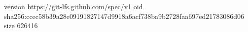 version https://git-lfs.github.com/spec/v1
oid sha256:ccec58b39a28e09191827147d9918a6acf738ba9b2728faa697ed21783086d06
size 626416
